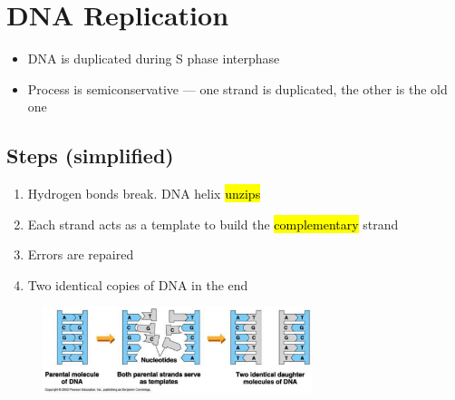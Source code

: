 \documentclass[a4paper,12pt]{article}
\begin{document}
\section{DNA Replication}
\begin{itemize}
    \item{DNA is duplicated during S phase interphase}
    \item{Process is semiconservative --- one strand is duplicated, the other is the old one}
\end{itemize}

\subsection{Steps (simplified)}
\begin{enumerate}
    \item{Hydrogen bonds break. DNA helix \hl{unzips}}
    \item{Each strand acts as a template to build the \hl{complementary} strand}
    \item{Errors are repaired}
    \item{Two identical copies of DNA in the end}
\end{enumerate}

\begin{figure}[H]
    \centering
    \includegraphics[width=0.7\textwidth]{replication}
\end{figure}
\end{document}
